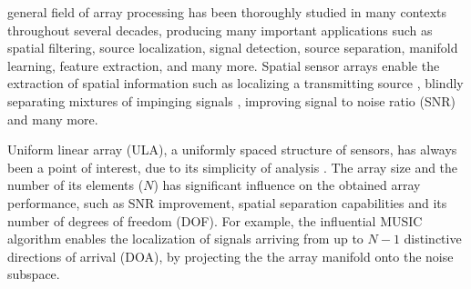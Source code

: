 general field of array processing has been thoroughly studied in many contexts throughout several decades, producing many important applications such as spatial filtering, source localization, signal detection, source separation, manifold learning, feature extraction, and many more.
Spatial sensor arrays enable the extraction of spatial information such as localizing a transmitting source \cite{skolnik2008radar} , blindly separating mixtures of impinging signals \cite{Comon1994IndependentConcept} , improving signal to noise ratio (SNR) \cite{Frost1972AProcessing,verdu1998multiuser} and many more. 
\par Uniform linear array (ULA), a uniformly spaced structure of sensors, has always been a point of interest, due to its simplicity of analysis \cite{VanTrees2002DetectionIV}. 
The array size and the number of its elements ($N$) has significant influence on the obtained array performance, such as SNR improvement, spatial separation capabilities and its number of degrees of freedom (DOF). For example, the influential MUSIC algorithm \cite{Ralph1986MultipleParameter} enables the localization of signals arriving from up to $N-1$ distinctive directions of arrival (DOA), by projecting the the array manifold onto the noise subspace.
